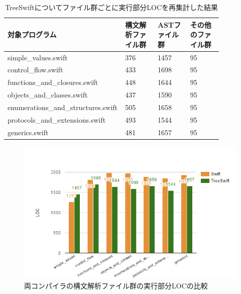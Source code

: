 \begin{table}[!hbtp]
    \begin{center}
        \caption{TreeSwiftについてファイル群ごとに実行部分LOCを再集計した結果}
        \begin{tabular}{|p{0.4\linewidth}|p{0.15\linewidth}|p{0.15\linewidth}|p{0.15\linewidth}|}
            \hline
            対象プログラム & 構文解析ファイル群 & ASTファイル群 & その他のファイル群\\
            \hline
            \hline
            simple\_values.swift & 376 & 1457 & 95\\
            \hline
            control\_flow.swift & 433 & 1698 & 95\\
            \hline
            functions\_and\_closures.swift & 448 & 1644 & 95\\
            \hline
            objects\_and\_classes.swift & 437 & 1590 & 95\\
            \hline
            enumerations\_and\_structures.swift & 505 & 1658 & 95\\
            \hline
            protocols\_and\_extensions.swift & 493 & 1544 & 95\\
            \hline
            generics.swift & 481 & 1657 & 95\\
            \hline
        \end{tabular}
        \label{table:loc-treeswift-per-file}
    \end{center}
\end{table}

\begin{figure}
    \begin{center}
        \includegraphics[scale=0.8]{./img/parse_loc_result.png}
        \caption{両コンパイラの構文解析ファイル群の実行部分LOCの比較}
        \label{img:parse-loc-result}
    \end{center}
\end{figure}

